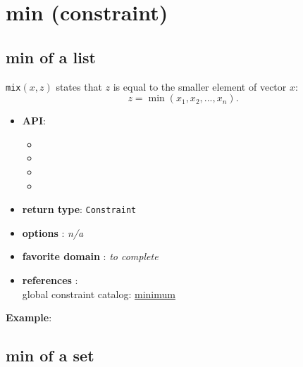 \label{min}
\hypertarget{min}{}

\section{min (constraint)}\label{min:minconstraint}\hypertarget{min:minconstraint}{}

\subsection{min of a list}\label{min:minofalist}\hypertarget{min:minofalist}{}

\begin{notedef}
  \texttt{mix}$(x,z)$ states that $z$ is equal to the smaller element
  of vector $x$:
$$z = \min(x_1, x_2, ..., x_n).$$
\end{notedef}
\begin{itemize}
	\item \textbf{API}:
	\begin{itemize}
		\item {}
		\item {}
		\item {}
		\item {}
	\end{itemize}
	\item \textbf{return type}: \texttt{Constraint}
	\item \textbf{options} : \emph{n/a}
	\item \textbf{favorite domain} : \emph{to complete}
	\item \textbf{references} :\\
      global constraint catalog: \href{http://www.emn.fr/x-info/sdemasse/gccat/Cminimum.html}{minimum}
\end{itemize}

\textbf{Example}:


\subsection{min of a set}\label{min:minofaset}\hypertarget{min:minofaset}{}

